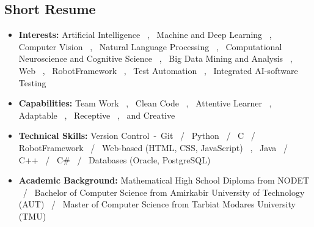 \documentclass[lighthipster]{simplehipstercv}
\begin{document}
\begin{paracol}{2}
{\phantom{turn the page}

\phantom{turn the page}
}
\switchcolumn

\small
\section*{Short Resume}

\begin{itemize}
	
	\item 
	\textbf{Interests:}  
	Artificial Intelligence ~,~  
	Machine and Deep Learning ~,~  
	Computer Vision ~,~  
	Natural Language Processing ~,~  
	Computational Neuroscience and Cognitive Science ~,~  
	Big Data Mining and Analysis ~,~  
	Web ~,~  
	RobotFramework ~,~  
	Test Automation ~,~  
	Integrated AI-software Testing  
	
	\item 
	\textbf{Capabilities:}  
	Team Work ~,~  
	Clean Code ~,~  
	Attentive Learner ~,~  
	Adaptable ~,~  
	Receptive ~,~  
	and Creative  
	
	\item 
	\textbf{Technical Skills:}  
	Version Control~-~Git ~/~
	Python ~/~
	C ~/~
	RobotFramework ~/~
	Web-based (HTML, CSS, JavaScript) ~,~  
	Java ~/~
	C++ ~/~
	C\# ~/~
	Databases (Oracle, PostgreSQL)  
	
	\item 
	\textbf{Academic Background:}  
	Mathematical High School Diploma from NODET ~/~
	Bachelor of Computer Science from Amirkabir University of Technology (AUT) ~/~
	Master of Computer Science from Tarbiat Modares University (TMU)  
	
\end{itemize}





\vspace{3em}


\begin{minipage}[t]{0.35\textwidth}

\end{minipage}
\end{paracol}
\end{document}
